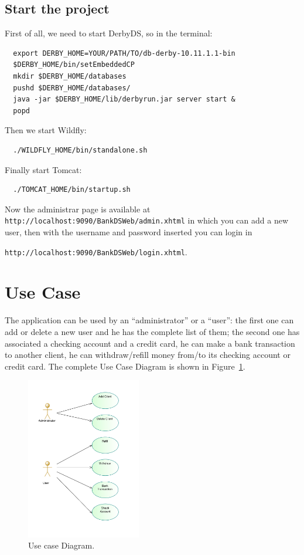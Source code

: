 \documentclass[a4paper]{article}
\begin{document}
\subsection{Start the project}
\label{subsec:start}
First of all, we need to start DerbyDS, so in the terminal:

\begin{verbatim}
  export DERBY_HOME=YOUR/PATH/TO/db-derby-10.11.1.1-bin
  $DERBY_HOME/bin/setEmbeddedCP
  mkdir $DERBY_HOME/databases
  pushd $DERBY_HOME/databases/
  java -jar $DERBY_HOME/lib/derbyrun.jar server start &
  popd
\end{verbatim}

Then we start Wildfly:
\begin{verbatim}
  ./WILDFLY_HOME/bin/standalone.sh
\end{verbatim}

Finally start Tomcat:
\begin{verbatim}
  ./TOMCAT_HOME/bin/startup.sh
\end{verbatim}

Now the administrar page is available at \verb|http://localhost:9090/BankDSWeb/admin.xhtml| in which you can add a new user, then with the username and password inserted you can login in 

\noindent
\verb|http://localhost:9090/BankDSWeb/login.xhtml|.


\section{Use Case}
\label{sec:req_analysis}
The application can be used by an ``administrator'' or a ``user'': the first one can add or delete a new user and he has the complete list of them; the second one has associated a checking account and a credit card, he can make a bank transaction to another client, he can withdraw/refill money from/to its checking account or credit card. The complete Use Case Diagram is shown in Figure~\ref{fig:use_case_diagram}.

\begin{figure}[ht]
  \centering
  \includegraphics[keepaspectratio=true, width=5cm]{use_case_diagram}\caption{Use case Diagram.}
  \label{fig:use_case_diagram}
\end{figure}
\end{document}
